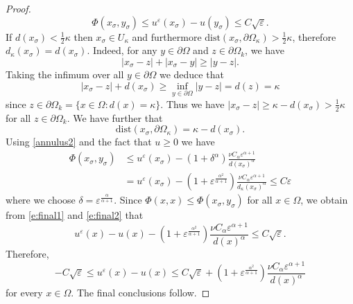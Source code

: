 \documentclass[11pt,reqno]{amsart}
\numberwithin{figure}{section}
\theoremstyle{plain}
\theoremstyle{remark}
\numberwithin{equation}{section}
\begin{document}
\begin{proof}
\begin{equation}\label{e:final1}
    \Phi(x_\sigma,y_\sigma) \leq u^\varepsilon(x_\sigma) - u(y_\sigma) \leq C\sqrt{\varepsilon}.
\end{equation}
If $d(x_\sigma) < \frac{1}{2}\kappa$ then $x_\sigma \in U_\kappa$ and furthermore $\mathrm{dist}(x_\sigma,\partial \Omega_\kappa) > \frac{1}{2}\kappa$, therefore $d_\kappa(x_\sigma) = d(x_\sigma)$. Indeed, for any $y\in\partial\Omega$ and $z\in \partial\Omega_k$, we have
\begin{equation*}
    |x_\sigma - z| + |x_\sigma - y| \geq |y-z|.
\end{equation*}
Taking the infimum over all $y\in \partial\Omega$ we deduce that
\begin{equation*}
    |x_\sigma - z| + d(x_\sigma) \geq \inf_{y\in \partial \Omega}|y-z| = d(z) = \kappa
\end{equation*}
since $z\in \partial\Omega_k = \{x \in \Omega: d(x) = \kappa\}$. Thus we have $|x_\sigma - z| \geq \kappa - d(x_\sigma) > \frac{1}{2}\kappa$ for all $z\in \partial\Omega_k$. We have further that
\begin{equation*}
    \mathrm{dist}(x_\sigma,\partial\Omega_\kappa) = \kappa - d(x_\sigma).
\end{equation*}
Using \eqref{annulus2} and the fact that $u \geq 0$ we have
\begin{align}
    \Phi(x_\sigma, y_\sigma) &\leq u^\varepsilon (x_\sigma)-\left(1+\delta^\alpha\right)\frac{\nu C_\alpha  \varepsilon^{\alpha+1}}{d(x_\sigma)^\alpha}\nonumber\\
    &= u^\varepsilon (x_\sigma)-\left(1+\varepsilon^{\frac{\alpha^2}{\alpha+1}}\right)\frac{\nu C_\alpha  \varepsilon^{\alpha+1}}{d_\kappa(x_\sigma)^\alpha}
    \leq C \varepsilon\label{e:final2}
\end{align}
where we choose $\delta = \varepsilon^{\frac{\alpha}{\alpha+1}}$. Since $\Phi(x,x) \leq \Phi(x_\sigma,y_\sigma)$ for all $x\in \Omega$, we obtain from \eqref{e:final1} and \eqref{e:final2} that
\begin{equation*}
    u^\varepsilon(x)-u(x)-\left(1+\varepsilon^{\frac{\alpha^2}{\alpha+1}}\right)\frac{\nu C_\alpha  \varepsilon^{\alpha+1}}{d(x)^\alpha} \leq C\sqrt{\varepsilon}.
\end{equation*}
Therefore,
\begin{equation}
   -C \sqrt{\varepsilon}\leq  u^\varepsilon(x) - u(x) \leq C\sqrt{\varepsilon} + \left(1+\varepsilon^{\frac{\alpha^2}{\alpha+1}}\right)\frac{\nu C_\alpha  \varepsilon^{\alpha+1}}{d(x)^\alpha} 
\end{equation}
for every $x\in \Omega$. The final conclusions follow.
\end{proof}
\end{document}
